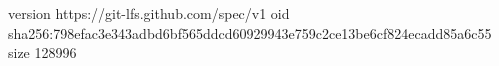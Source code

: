 version https://git-lfs.github.com/spec/v1
oid sha256:798efac3e343adbd6bf565ddcd60929943e759c2ce13be6cf824ecadd85a6c55
size 128996
